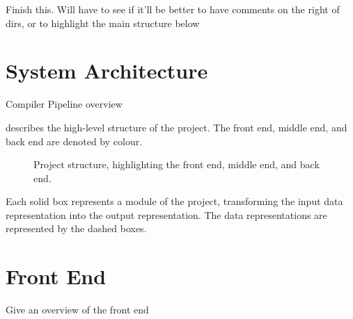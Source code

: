 \documentclass[00-main.tex]{subfiles}
\begin{document}

\begin{Comment}
Finish this. Will have to see if it'll be better to have comments on the right of dirs, or to highlight the main structure below
\end{Comment}

\section{System Architecture}

\begin{Comment}
Compiler Pipeline overview
\end{Comment}

 describes the high-level structure of the project. The \textcolor{frontendcolor}{front end}, \textcolor{middleendcolor}{middle end}, and \textcolor{backendcolor}{back end} are denoted by colour.

\begin{figure}[H]
  \centering
  \caption{Project structure, highlighting the \textcolor{frontendcolor}{front end}, \textcolor{middleendcolor}{middle end}, and \textcolor{backendcolor}{back end}.}
  \label{fig:project flowchart}
\end{figure}

Each solid box represents a module of the project, transforming the input data representation into the output representation.
The data representations are represented by the dashed boxes.


\section{Front End}

\begin{Comment}
Give an overview of the front end
\end{Comment}
\end{document}
